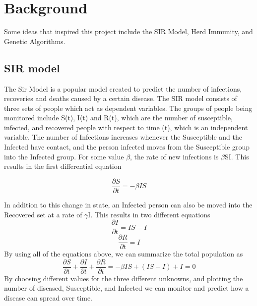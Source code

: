 \documentclass[a4paper,11pt]{article}
\begin{document}
    \section{Background}\label{sec:background}
    Some ideas that inspired this project include the SIR Model\cite{herdImm}, Herd Immunity\cite{herdImm}, and Genetic Algorithms.\cite{genetic}
    \subsection{SIR model}\label{subsec:sir-model}
    The Sir Model is a popular model created to predict the number of infections, recoveries and deaths caused by a certain disease.
    The SIR model consists of three sets of people which act as dependent variables.
    The groups of people being monitored include S(t), I(t) and R(t), which are the number of susceptible, infected, and recovered people with respect to time (t), which is an independent variable.
    The number of Infections increases whenever the Susceptible and the Infected have contact, and the person infected moves from the Susceptible group into the Infected group.
    For some value $\beta$, the rate of new infections is $\beta$SI.
    This results in the first differential equation

    \begin{equation}
        \frac{\partial S}{\partial t} = -\beta IS
    \end{equation}

    In addition to this change in state, an Infected person can also be moved into the Recovered set at a rate of $\gamma$I.
    This results in two different equations
    \begin{equation}
        \frac{\partial I}{\partial t} = IS - I
    \end{equation}
    \begin{equation}
        \frac{\partial R}{\partial t} = I
    \end{equation}
    By using all of the equations above, we can summarize the total population as
    \begin{equation}
        \frac{\partial S}{\partial t} + \frac{\partial I}{\partial t} + \frac{\partial R}{\partial t} = -\beta IS + ( IS - I) + I = 0
    \end{equation}
    By choosing different values for the three different unknowns, and plotting the number of diseased, Susceptible, and Infected we can monitor and predict how a disease can spread over time.
\end{document}
